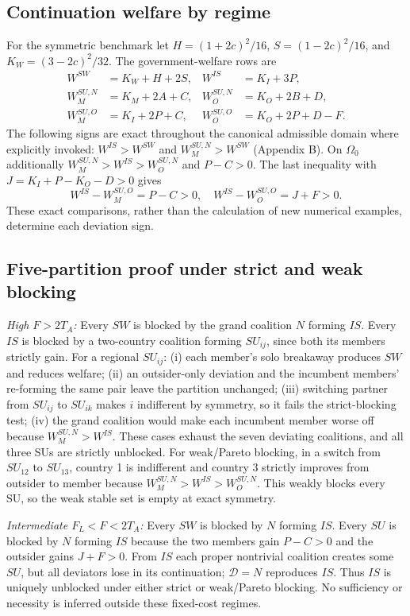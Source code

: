 \subsection{Continuation welfare by regime}
For the symmetric benchmark let $H=(1+2c)^2/16$,
$S=(1-2c)^2/16$, and $K_W=(3-2c)^2/32$. The government-welfare
rows are
\begin{align*}
W^{SW}&=K_W+H+2S,&W^{IS}&=K_I+3P,\\
W_M^{SU,N}&=K_M+2A+C,&W_O^{SU,N}&=K_O+2B+D,\\
W_M^{SU,O}&=K_I+2P+C,&W_O^{SU,O}&=K_O+2P+D-F.
\end{align*}
The following signs are exact throughout the canonical admissible domain
where explicitly invoked: $W^{IS}>W^{SW}$ and
$W_M^{SU,N}>W^{SW}$ (Appendix B). On $\Omega_0$ additionally
$W_M^{SU,N}>W^{IS}>W_O^{SU,N}$ and $P-C>0$.
The last inequality with $J=K_I+P-K_O-D>0$ gives
\[
W^{IS}-W_M^{SU,O}=P-C>0,\quad
W^{IS}-W_O^{SU,O}=J+F>0.
\]
These exact comparisons, rather than the calculation of new numerical
examples, determine each deviation sign.

\subsection{Five-partition proof under strict and weak blocking}
\emph{High $F>2T_A$:} Every $SW$ is blocked by the grand coalition $N$
forming $IS$. Every $IS$ is blocked by a two-country coalition forming
$SU_{ij}$, since both its members strictly gain. For a regional $SU_{ij}$:
(i) each member's solo breakaway produces $SW$ and reduces welfare;
(ii) an outsider-only deviation and the incumbent members' re-forming the
same pair leave the partition unchanged;
(iii) switching partner from $SU_{ij}$ to $SU_{ik}$ makes $i$ indifferent
by symmetry, so it fails the strict-blocking test;
(iv) the grand coalition would make each incumbent member worse off
because $W_M^{SU,N}>W^{IS}$. These cases exhaust the seven deviating
coalitions, and all three SUs are strictly unblocked. For weak/Pareto
blocking, in a switch from $SU_{12}$ to $SU_{13}$, country 1 is indifferent
and country 3 strictly improves from outsider to member because
$W_M^{SU,N}>W^{IS}>W_O^{SU,N}$. This weakly blocks every SU, so the weak
stable set is empty at exact symmetry.

\emph{Intermediate $F_L<F<2T_A$:} Every $SW$ is blocked by $N$ forming
$IS$. Every $SU$ is blocked by $N$ forming $IS$ because the two members
gain $P-C>0$ and the outsider gains $J+F>0$. From $IS$ each proper
nontrivial coalition creates some $SU$, but all deviators lose in its
continuation; $\mathcal D=N$ reproduces $IS$. Thus $IS$ is uniquely
unblocked under either strict or weak/Pareto blocking. No sufficiency or
necessity is inferred outside these fixed-cost regimes.

